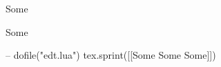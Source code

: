 \documentclass{article}
\begin{document}
Some

Some

\begin{luacode*}
    -- dofile("edt.lua")
	tex.sprint([[Some Some Some]])
\end{luacode*}


			
\end{document}
